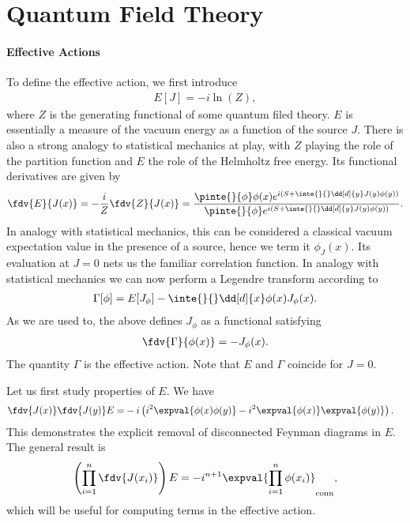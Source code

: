 \section{Quantum Field Theory}

\paragraph{Effective Actions}
To define the effective action, we first introduce
\begin{align*}
	E[J] = -i\ln(Z),
\end{align*}
where $Z$ is the generating functional of some quantum filed theory. $E$ is essentially a measure of the vacuum energy as a function of the source $J$. There is also a strong analogy to statistical mechanics at play, with $Z$ playing the role of the partition function and $E$ the role of the Helmholtz free energy. Its functional derivatives are given by
\begin{align*}
	\fdv{E}{J(x)} = -\frac{i}{Z}\fdv{Z}{J(x)} = \frac{\pinte{}{\phi}\phi(x)e^{i\left(S + \inte{}{}\dd[d]{y}J(y)\phi(y)\right)}}{\pinte{}{\phi}e^{i\left(S + \inte{}{}\dd[d]{y}J(y)\phi(y)\right)}}.
\end{align*}
In analogy with statistical mechanics, this can be considered a classical vacuum expectation value in the presence of a source, hence we term it $\phi_{J}(x)$. Its evaluation at $J = 0$ nets us the familiar correlation function. In analogy with statistical mechanics we can now perform a Legendre transform according to
\begin{align*}
	\Gamma[\phi] = E[J_{\phi}] - \inte{}{}\dd[d]{x}\phi(x)J_{\phi}(x).
\end{align*}
As we are used to, the above defines $J_{\phi}$ as a functional satisfying
\begin{align*}
	\fdv{\Gamma}{\phi(x)} = -J_{\phi}(x).
\end{align*}
The quantity $\Gamma$ is the effective action. Note that $E$ and $\Gamma$ coincide for $J = 0$.

Let us first study properties of $E$. We have
\begin{align*}
	\fdv{J(x)}\fdv{J(y)}E =& -i\left(i^{2}\expval{\phi(x)\phi(y)} - i^{2}\expval{\phi(x)}\expval{\phi(y)}\right).
\end{align*}
This demonstrates the explicit removal of disconnected Feynman diagrams in $E$. The general result is
\begin{align*}
	\left(\prod\limits_{i = 1}^{n}\fdv{J(x_{i})}\right)E = -i^{n + 1}\expval{\prod\limits_{i = 1}^{n}\phi(x_{i})}_{\text{conn}},
\end{align*}
which will be useful for computing terms in the effective action.

